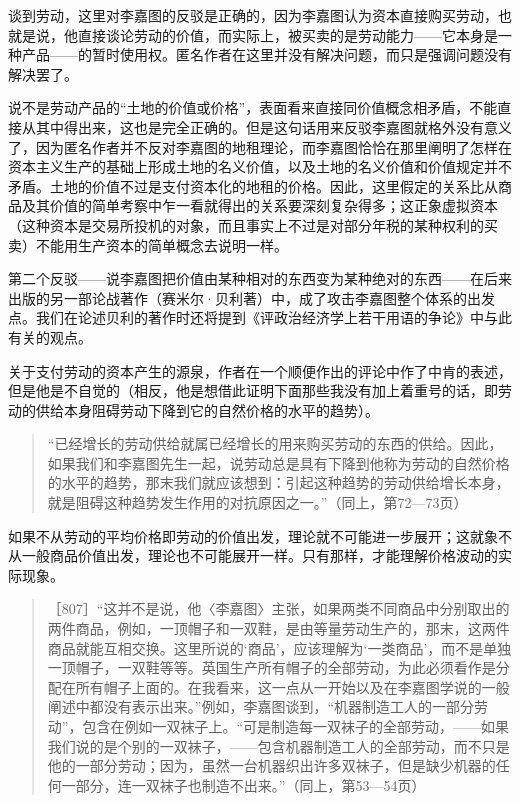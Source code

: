谈到劳动，这里对李嘉图的反驳是正确的，因为李嘉图认为资本直接购买劳动，也就是说，他直接谈论劳动的价值，而实际上，被买卖的是劳动能力——它本身是一种产品——的暂时使用权。匿名作者在这里并没有解决问题，而只是强调问题没有解决罢了。

说不是劳动产品的“土地的价值或价格”，表面看来直接同价值概念相矛盾，不能直接从其中得出来，这也是完全正确的。但是这句话用来反驳李嘉图就格外没有意义了，因为匿名作者并不反对李嘉图的地租理论，而李嘉图恰恰在那里阐明了怎样在资本主义生产的基础上形成土地的名义价值，以及土地的名义价值和价值规定并不矛盾。土地的价值不过是支付资本化的地租的价格。因此，这里假定的关系比从商品及其价值的简单考察中乍一看就得出的关系要深刻复杂得多；这正象虚拟资本（这种资本是交易所投机的对象，而且事实上不过是对部分年税的某种权利的买卖）不能用生产资本的简单概念去说明一样。

第二个反驳——说李嘉图把价值由某种相对的东西变为某种绝对的东西——在后来出版的另一部论战著作（赛米尔·贝利著）中，成了攻击李嘉图整个体系的出发点。我们在论述贝利的著作时还将提到《评政治经济学上若干用语的争论》中与此有关的观点。

关于支付劳动的资本产生的源泉，作者在一个顺便作出的评论中作了中肯的表述，但是他是不自觉的（相反，他是想借此证明下面那些我没有加上着重号的话，即劳动的供给本身阻碍劳动下降到它的自然价格的水平的趋势）。

\begin{quote}{“已经增长的劳动供给就属已经增长的用来购买劳动的东西的供给。因此，如果我们和李嘉图先生一起，说劳动总是具有下降到他称为劳动的自然价格的水平的趋势，那末我们就应该想到：引起这种趋势的劳动供给增长本身，就是阻碍这种趋势发生作用的对抗原因之一。”（同上，第72—73页）}\end{quote}

如果不从劳动的平均价格即劳动的价值出发，理论就不可能进一步展开；这就象不从一般商品价值出发，理论也不可能展开一样。只有那样，才能理解价格波动的实际现象。

\begin{quote}{［807］“这并不是说，他〈李嘉图〉主张，如果两类不同商品中分别取出的两件商品，例如，一顶帽子和一双鞋，是由等量劳动生产的，那末，这两件商品就能互相交换。这里所说的‘商品’，应该理解为‘一类商品’，而不是单独一顶帽子，一双鞋等等。英国生产所有帽子的全部劳动，为此必须看作是分配在所有帽子上面的。在我看来，这一点从一开始以及在李嘉图学说的一般阐述中都没有表示出来。”例如，李嘉图谈到，“机器制造工人的一部分劳动”，包含在例如一双袜子上。“可是制造每一双袜子的全部劳动，——如果我们说的是个别的一双袜子，——包含机器制造工人的全部劳动，而不只是他的一部分劳动；因为，虽然一台机器织出许多双袜子，但是缺少机器的任何一部分，连一双袜子也制造不出来。”（同上，第53—54页）}\end{quote}

